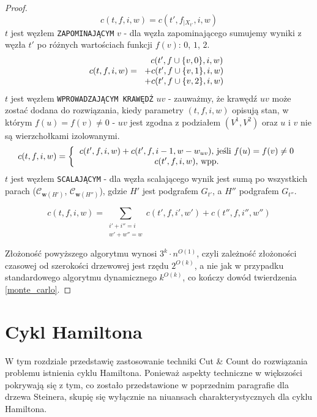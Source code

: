 \documentclass[12pt, oneside]{report}
\newcommand\Omicron{O}
\begin{document}
\begin{proof}
$$c(t,f,i,w) = c(t',f_{\big|X_{t'}},i,w)$$
\newline
$t$ jest węzłem \texttt{ZAPOMINAJĄCYM} $v$ - dla węzła zapominającego sumujemy wyniki z węzła $t'$ po różnych wartościach funkcji $f(v)$: $0$, $1$, $2$.
\[
c(t,f,i,w) =  
  \begin{tabular}{ccc}
  $\ \ c(t',f \cup \{v, 0\},i,w)$\\
  $+ c(t',f \cup \{v, 1\},i,w)$\\
  $+ c(t',f \cup \{v, 2\},i,w)$
  \end{tabular}
\]
\newline
$t$ jest węzłem \texttt{WPROWADZAJĄCYM KRAWĘDŹ} $uv$ - zauważmy, że krawędź $uv$ może zostać dodana do rozwiązania, kiedy parametry $(t,f,i,w)$ opisują stan, w którym $f(u) = f(v) \neq 0$ - $uv$ jest zgodna z podziałem $(V^1, V^2)$ oraz $u$ i $v$ nie są wierzchołkami izolowanymi.
\[
c(t,f,i,w) =  
\left \{
  \begin{tabular}{ccc}
  $c(t',f,i,w) + c(t',f,i-1,w-w_{uv})$, jeśli $f(u) = f(v) \neq 0$ \\
  $c(t',f,i,w)$, wpp. \\
  \end{tabular}
\right. 
\]
$t$ jest węzłem \texttt{SCALAJĄCYM} - dla węzła scalającego wynik jest sumą po wszystkich parach ($\mathcal{C}_{\mathbf{w}(H')}$, $\mathcal{C}_{\mathbf{w}(H'')}$), gdzie $H'$ jest podgrafem $G_{t'}$, a $H''$ podgrafem $G_{t''}$.

$$c(t,f,i,w) = \sum_{\substack{
   i' + i'' = i \\
   w' + w'' = w
  }} c(t',f,i',w') + c(t'',f,i'',w'')$$

Złożoność powyższego algorytmu wynosi $3^k \cdot n^{\Omicron(1)}$, czyli zależność złożoności czasowej od szerokości drzewowej jest rzędu $2^{\Omicron(k)}$, a nie jak w przypadku standardowego algorytmu dynamicznego $k^{\Omicron(k)}$, co kończy dowód twierdzenia \ref{monte_carlo}.
\end{proof}

    	\section{Cykl Hamiltona}

W tym rozdziale przedstawię zastosowanie techniki Cut \& Count do rozwiązania problemu istnienia cyklu Hamiltona. Ponieważ aspekty techniczne w większości pokrywają się z tym, co zostało przedstawione w poprzednim paragrafie dla drzewa Steinera, skupię się wyłącznie na niuansach charakterystycznych dla cyklu Hamiltona.
\end{document}
